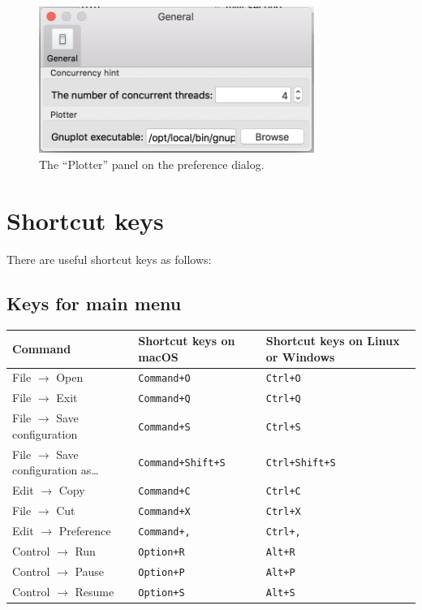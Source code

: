 \documentclass[a4paper,10pt]{report}
\begin{document}
\begin{figure}[htbp]
\centering
\includegraphics[width=0.8\textwidth]{image/preference-plotter.png}
\caption{\label{fig:orgbe635f5}The ``Plotter'' panel on the preference dialog.}
\end{figure}

\section{Shortcut keys}
\label{sec:orge5d6eaf}
There are useful shortcut keys as follows:

\subsection{Keys for main menu}
\label{sec:orgfe3076e}
\begin{center}
\begin{tabular}{l||l|l}
Command & Shortcut keys on macOS & Shortcut keys on Linux or Windows\\
\hline
File \(\to\) Open & \texttt{Command+O} & \texttt{Ctrl+O}\\
File \(\to\) Exit & \texttt{Command+Q} & \texttt{Ctrl+Q}\\
File \(\to\) Save configuration & \texttt{Command+S} & \texttt{Ctrl+S}\\
File \(\to\) Save configuration as\ldots{} & \texttt{Command+Shift+S} & \texttt{Ctrl+Shift+S}\\
Edit \(\to\) Copy & \texttt{Command+C} & \texttt{Ctrl+C}\\
File \(\to\) Cut & \texttt{Command+X} & \texttt{Ctrl+X}\\
Edit \(\to\) Preference & \texttt{Command+,} & \texttt{Ctrl+,}\\
Control \(\to\) Run & \texttt{Option+R} & \texttt{Alt+R}\\
Control \(\to\) Pause & \texttt{Option+P} & \texttt{Alt+P}\\
Control \(\to\) Resume & \texttt{Option+S} & \texttt{Alt+S}\\
\end{tabular}
\end{center}
\end{document}
